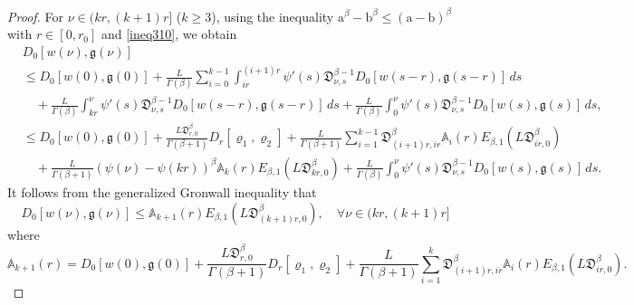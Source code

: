 \documentclass[10pt,a4paper]{amsart}
\numberwithin{equation}{section}
\begin{document}
\begin{proof}
For $\nu \in (k r,(k+1) r]$ ($k \geq 3$), using the inequality 
$\mathrm{a}^\beta - \mathrm{b}^\beta \leq (\mathrm{a}-\mathrm{b})^\beta$ with 
$ r \in [0,r_0]$ and \eqref{ineq310}, we obtain
\begin{align*}
&D_0[ w(\nu ), \mathfrak{g}(\nu )] \\
&\leq  D_0[ w(0), \mathfrak{g}(0)]+\frac{ L}{\Gamma(\beta)} 
\sum_{i=0}^{k-1} \int_{i r}^{(i+1) r} \psi'(s)\mathfrak{D}_{\nu ,s}^{\beta-1} 
 D_0[ w(s- r), \mathfrak{g}(s- r)]\,ds \\
&\quad +\frac{ L}{\Gamma(\beta)} \int_{k r}^{\nu } \psi'(s)
 \mathfrak{D}_{\nu ,s}^{\beta-1} D_0[ w(s- r), \mathfrak{g}(s- r)]\,ds 
 +\frac{ L}{\Gamma(\beta)} \int_0^{\nu } \psi'(s)\mathfrak{D}_{\nu ,s}^{\beta-1}
  D_0[ w(s), \mathfrak{g}(s)]\,ds, \\
&\leq  D_0[ w(0), \mathfrak{g}(0)]+\frac{ L\mathfrak{D}_{ r,0}^{\beta}}{\Gamma(\beta+1)} 
 D_{ r}[\varrho_{1}, \varrho_{2}] 
 +\frac{ L}{\Gamma(\beta+1)} \sum_{i=1}^{k-1}\mathfrak{D}_{(i+1) r,i r}^{\beta} 
 \mathbb{A}_{i}( r) E_{\beta, 1}( L\mathfrak{D}_{i r,0}^{\beta}) \\
&\quad +\frac{ L}{\Gamma(\beta+1)}(\psi(\nu )-\psi(k r))^{\beta} \mathbb{A}_{k}
 ( r) E_{\beta, 1}( L\mathfrak{D}_{k r,0}^{\beta})
 +\frac{ L}{\Gamma(\beta)} \int_0^{\nu } \psi'(s)\mathfrak{D}_{\nu ,s}^{\beta-1} 
 D_0[ w(s), \mathfrak{g}(s)]\,ds.
\end{align*}
It follows from the generalized Gronwall inequality that
\begin{equation}\label{ineq312}
D_0[ w(\nu ), \mathfrak{g}(\nu )] 
\leq \mathbb{A}_{k+1}( r) E_{\beta, 1}( L\mathfrak{D}_{(k+1) r,0}^{\beta}), 
\quad \forall \nu \in(k r,(k+1) r] 
\end{equation}
where
\begin{equation} \label{eq313}
\mathbb{A}_{k+1}( r)=  D_0[ w(0), \mathfrak{g}(0)]
+\frac{ L\mathfrak{D}_{ r,0}^{\beta}}{\Gamma(\beta+1)} D_{ r}[\varrho_{1},
\varrho_{2}] +\frac{ L}{\Gamma(\beta+1)}
 \sum_{i=1}^{k}\mathfrak{D}_{(i+1) r,i r}^{\beta} \mathbb{A}_{i}( r) E_{\beta, 1}
 ( L\mathfrak{D}_{i r,0}^{\beta}) .
\end{equation}


\end{proof}
\end{document}
